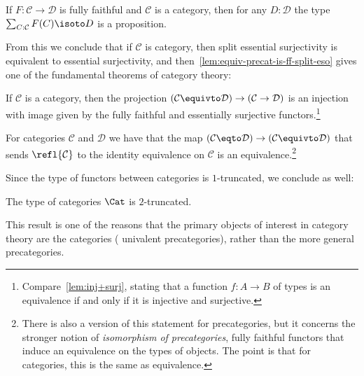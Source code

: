 \begin{lemma}\label{lem:ff-eso}
  If $F : \mathcal C \to \mathcal D$ is fully faithful and $\mathcal C$
  is a category, then for any $D : \mathcal D$ the type
  $\sum_{C:\mathcal C}F(C) \isoto D$ is a proposition.
\end{lemma}
From this we conclude that if $\mathcal C$ is category,
then split essential surjectivity
is equivalent to essential surjectivity,
and then~\cref{lem:equiv-precat-is-ff-split-eso}
gives one of the fundamental theorems of category theory:
\begin{theorem}\label{thm:ff-eso-equiv}
  If $\mathcal C$ is a category, then the projection
  $(\mathcal C\equivto \mathcal D) \to (\mathcal C \to \mathcal D)$
  is an injection with image given
  by the fully faithful and essentially surjective functors.\footnote{%
    Compare~\cref{lem:inj+surj}, stating that a function
    $f : A \to B$ of types is an equivalence if and only if it is
    injective and surjective.}
\end{theorem}
\begin{corollary}\label{cor:Cat-ua}
  For categories $\mathcal C$ and $\mathcal D$ we have that
  the map $(\mathcal C \eqto \mathcal D) \to (\mathcal C \equivto \mathcal D)$
  that sends $\refl{\mathcal C}$ to the identity equivalence on $\mathcal C$
  is an equivalence.\footnote{%
    There is also a version of this statement for precategories,
    but it concerns the stronger notion of \emph{isomorphism of precategories},
    \ie fully faithful functors that induce an equivalence on the types of objects.
    The point is that for categories, this is the same as equivalence.}
\end{corollary}

Since the type of functors between categories is $1$-truncated,
we conclude as well:
\begin{corollary}\label{cor:cat-2-type}
  The type of categories $\Cat$ is $2$-truncated.
\end{corollary}

This result is one of the reasons that the primary objects
of interest in category theory are the categories (\ie
univalent precategories), rather than the more general precategories.

